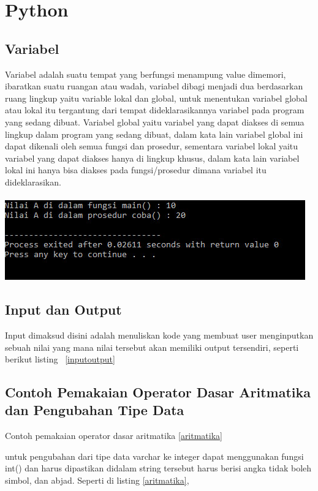 \chapter{Python}
\section{Variabel}
\par
Variabel adalah suatu tempat yang berfungsi menampung value dimemori, ibaratkan suatu ruangan atau wadah,  variabel dibagi menjadi dua berdasarkan ruang lingkup yaitu variable lokal dan global, untuk menentukan variabel global atau lokal itu tergantung dari tempat dideklarasikannya variabel pada program yang sedang dibuat. Variabel global yaitu variabel yang dapat diakses di semua lingkup  dalam program yang sedang dibuat, dalam kata lain variabel global ini dapat dikenali oleh semua fungsi dan prosedur, sementara variabel lokal yaitu variabel yang dapat diakses hanya di lingkup khusus, dalam kata lain variabel lokal ini hanya bisa diakses pada fungsi/prosedur dimana variabel itu dideklarasikan.\\ \\
\includegraphics[scale=0.7]{figures/variabel.png} 
        \section{Input dan Output}
        Input dimaksud disini adalah menuliskan kode yang membuat user menginputkan sebuah nilai yang mana nilai tersebut akan memiliki output tersendiri, seperti berikut listing ~\ref{inputoutput}
      
        
        
        \section{Contoh Pemakaian Operator Dasar Aritmatika dan Pengubahan Tipe Data}
        Contoh pemakaian operator dasar aritmatika \ref{aritmatika}
        
        untuk pengubahan dari tipe data varchar ke integer dapat menggunakan fungsi int() dan harus dipastikan didalam string tersebut harus berisi angka tidak boleh simbol, dan abjad. Seperti di listing \ref{aritmatika},
        
